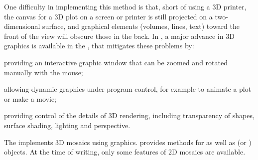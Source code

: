 \documentclass[11pt]{book}
\begin{document}
One difficulty in implementing this method is that, short of using a 3D printer,
the canvas for a 3D plot on a screen or printer is still projected 
on a two-dimensional surface, and graphical elements (volumes, lines, text)
toward the front of the view will obscure those in the back.
In \R, a major advance in 3D graphics is available in the ,
that mitigates these problems by:
\begin{seriate}
 \item providing an interactive graphic window that can be zoomed and rotated
 manually with the mouse;
 \item allowing dynamic graphics under program control, for example to animate
 a plot or make a movie;
 \item providing control of the details of 3D rendering, including transparency
 of shapes, surface shading, lighting and perspective.
\end{seriate}

The  implements 3D mosaics using  graphics.
 provides methods for 
as well as  (or ) objects.
At the time of writing, only some features of 2D mosaics are available.
\end{document}
